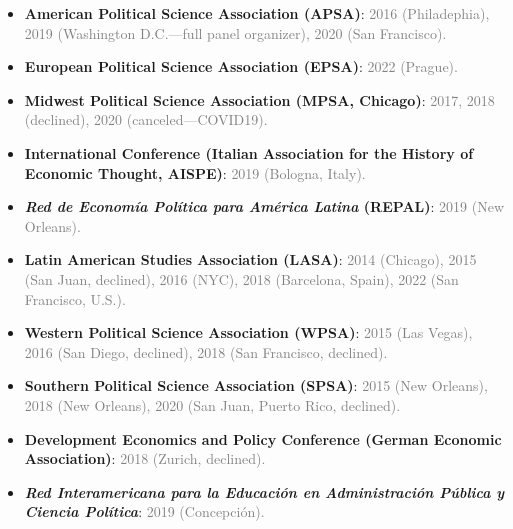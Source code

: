 \begin{itemize}
\item[\textcolor{gray}{\textbullet}] {\bf American Political Science Association (APSA)}: \textcolor{gray}{2016 (Philadephia), 2019 (Washington D.C.---full panel organizer), 2020 (San Francisco).}
\item[\textcolor{gray}{\textbullet}] {\bf European Political Science Association (EPSA)}: \textcolor{gray}{2022 (Prague).}
\item[\textcolor{gray}{\textbullet}] {\bf Midwest Political Science Association (MPSA, Chicago)}: \textcolor{gray}{2017, 2018 (declined), 2020 (canceled---COVID19).}
\item[\textcolor{gray}{\textbullet}] {\bf International Conference (Italian Association for the History of Economic Thought, AISPE)}: \textcolor{gray}{2019 (Bologna, Italy).}
\item[\textcolor{gray}{\textbullet}] {\bf \emph{Red de Econom\'ia Pol\'itica para Am\'erica Latina} (REPAL)}: \textcolor{gray}{2019 (New Orleans).}
\item[\textcolor{gray}{\textbullet}] {\bf Latin American Studies Association (LASA)}: \textcolor{gray}{2014 (Chicago), 2015 (San Juan, declined), 2016 (NYC), 2018 (Barcelona, Spain), 2022 (San Francisco, U.S.).}
\item[\textcolor{gray}{\textbullet}] {\bf Western Political Science Association (WPSA)}: \textcolor{gray}{2015 (Las Vegas), 2016 (San Diego, declined), 2018 (San Francisco, declined).}
\item[\textcolor{gray}{\textbullet}] {\bf Southern Political Science Association (SPSA)}: \textcolor{gray}{2015 (New Orleans), 2018 (New Orleans), 2020 (San Juan, Puerto Rico, declined).}
\item[\textcolor{gray}{\textbullet}] {\bf Development Economics and Policy Conference (German Economic Association)}: \textcolor{gray}{2018 (Zurich, declined).}
\item[\textcolor{gray}{\textbullet}] {\bf \emph{Red Interamericana para la Educaci\'on en Administraci\'on P\'ublica y Ciencia Pol\'itica}}: \textcolor{gray}{2019 (Concepci\'on).}
\end{itemize}
